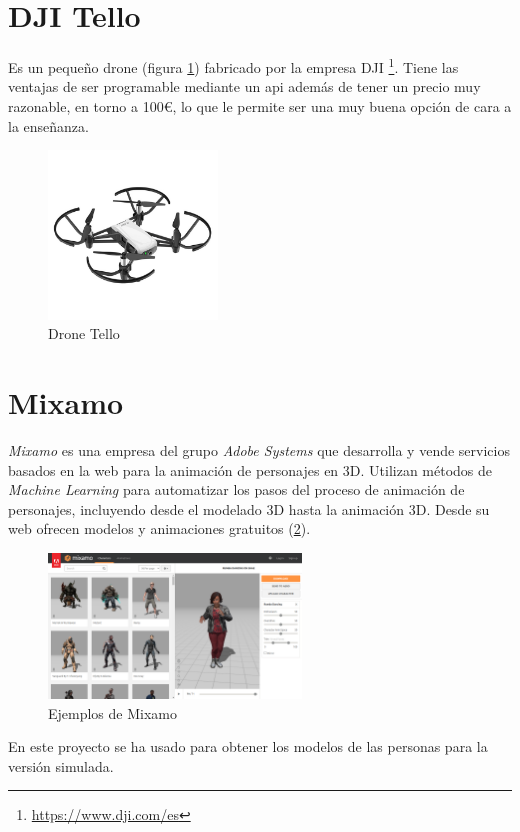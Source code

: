 \section{DJI Tello}
Es un pequeño drone (figura \ref{fig:tello}) fabricado por la empresa DJI \footnote{\url{https://www.dji.com/es}}. Tiene las ventajas de ser programable mediante un \acrshort{api} además de tener un precio muy razonable, en torno a 100€, lo que le permite ser una muy buena opción de cara a la enseñanza.
\begin{figure}[H]
  \begin{center}
    \includegraphics[width=0.4\textwidth]{figures/herramientas/tello.png}
		\caption{Drone Tello}
		\label{fig:tello}
		\end{center}
\end{figure}
\section{Mixamo}
\textit{Mixamo}\cite{mixamo} es una empresa del grupo \textit{Adobe Systems} que desarrolla y vende servicios basados en la web para la animación de personajes en 3D. Utilizan métodos de \textit{Machine Learning} para automatizar los pasos del proceso de animación de personajes, incluyendo desde el modelado 3D hasta la animación 3D. Desde su web ofrecen modelos y animaciones gratuitos (\ref{fig.mixamo}).
\begin{figure}[H]
  \begin{center}
    \includegraphics[width=0.6\textwidth]{figures/herramientas/mixamo.png}
		\caption{Ejemplos de Mixamo}
		\label{fig.mixamo}
		\end{center}
\end{figure}
En este proyecto se ha usado para obtener los modelos de las personas para la versión simulada.
